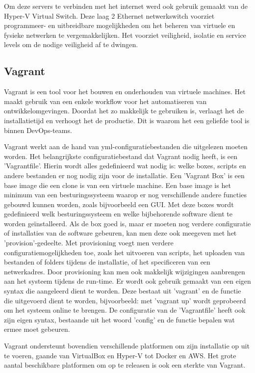 Om deze servers te verbinden met het internet werd ook gebruik gemaakt van de Hyper-V
Virtual Switch. Deze laag 2 Ethernet netwerkswitch voorziet programmeer- en uitbreidbare
mogelijkheden om het beheren van virtuele en fysieke netwerken te vergemakkelijken.
Het voorziet veiligheid, isolatie en service levels om de nodige veiligheid af te dwingen.

\subsection{Vagrant}
Vagrant is een tool voor het bouwen en onderhouden van virtuele machines. Het maakt gebruik van een enkele workflow voor het automatiseren van ontwikkelomgevingen. Doordat het zo makkelijk te gebruiken is, verlaagt het de installatietijd en verhoogt het de productie. Dit is waarom het een geliefde tool is binnen DevOps-teams.

Vagrant werkt aan de hand van yml-configuratiebestanden die uitgelezen moeten worden. Het belangrijkste configuratiebestand dat Vagrant nodig heeft, is een ’Vagrantfile’. Hierin wordt alles gedefinieerd wat nodig is: welke boxes, scripts en andere bestanden er nog nodig zijn voor de installatie. Een 'Vagrant Box' is een base image die een clone is van een virtuele machine. Een base image is het minimum van een besturingssysteem waarop er nog verschillende andere functies gebouwd kunnen worden, zoals bijvoorbeeld een GUI. Met deze boxes wordt gedefinieerd welk besturingssysteem en welke bijbehorende software dient te worden geïnstalleerd. Als de box goed is, maar er moeten nog verdere configuratie of installaties van de software gebeuren, kan men deze ook meegeven met het ’provision’-gedeelte. Met provisioning voegt men verdere configuratiemogelijkheden toe, zoals het uitvoeren van scripts, het uploaden van bestanden of folders tijdens de installatie, of het specificeren van een netwerkadres. Door provisioning kan men ook makkelijk wijzigingen aanbrengen aan het systeem tijdens de run-time. Er wordt ook gebruik gemaakt van een eigen syntax die aangeleerd dient te worden. Deze bestaat uit 'vagrant' en de functie die uitgevoerd dient te worden, bijvoorbeeld: met 'vagrant up' wordt geprobeerd om het systeem online te brengen. De configuratie van de 'Vagrantfile' heeft ook zijn eigen syntax, bestaande uit het woord ’config’ en de functie bepalen wat ermee moet gebeuren.

Vagrant ondersteunt bovendien verschillende platformen om zijn installatie op uit te voeren, gaande van VirtualBox en Hyper-V tot Docker en AWS. Het grote aantal beschikbare platformen om op te releasen is ook een sterkte van Vagrant.

